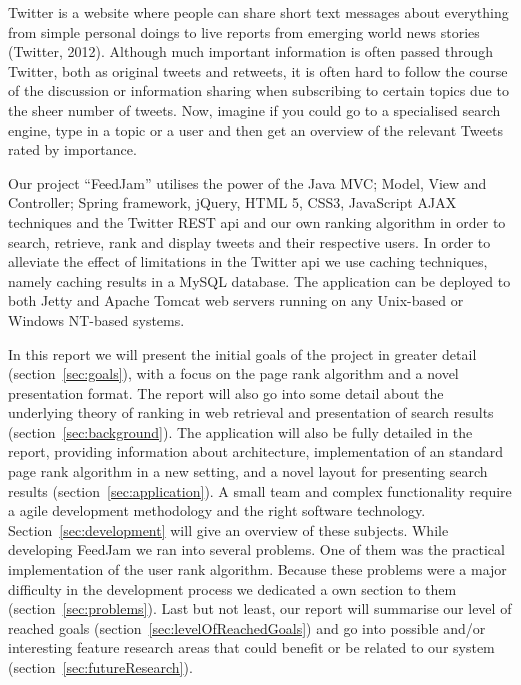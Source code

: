 Twitter is a website where people can share short text messages about everything from simple personal doings to live reports from emerging world news stories (Twitter, 2012). Although much important information is often passed through Twitter, both as original tweets and retweets, it is often hard to follow the course of the discussion or information sharing when subscribing to certain topics due to the sheer number of tweets. Now, imagine if you could go to a specialised search engine, type in a topic or a user and then get an overview of the relevant Tweets rated by importance.

Our project “FeedJam” utilises the power of the Java MVC; Model, View and Controller; Spring framework, jQuery, HTML 5, CSS3, JavaScript AJAX techniques and the Twitter REST api and our own ranking algorithm in order to search, retrieve, rank and display tweets and their respective users. In order to alleviate the effect of limitations in the Twitter api we use caching techniques, namely caching results in a MySQL database. The application can be deployed to both Jetty and Apache Tomcat web servers running on any Unix-based or Windows NT-based systems.

In this report we will present the initial goals of the project in greater detail (section~\ref{sec:goals}), with a focus on the page rank algorithm and a novel presentation format. The report will also go into some detail about the underlying theory of ranking in web retrieval and presentation of search results (section~\ref{sec:background}). The application will also be fully detailed in the report, providing information about architecture, implementation of an standard page rank algorithm in a new setting, and a novel layout for presenting search results (section~\ref{sec:application}). A small team and complex functionality require a agile development methodology and the right software technology. Section~\ref{sec:development} will give an overview of these subjects. While developing FeedJam we ran into several problems. One of them was the practical implementation of the user rank algorithm. Because these problems were a major difficulty in the development process we dedicated a own section to them (section~\ref{sec:problems}). Last but not least, our report will summarise our level of reached goals (section~\ref{sec:levelOfReachedGoals}) and go into possible and/or interesting feature research areas that could benefit or be related to our system (section~\ref{sec:futureResearch}).